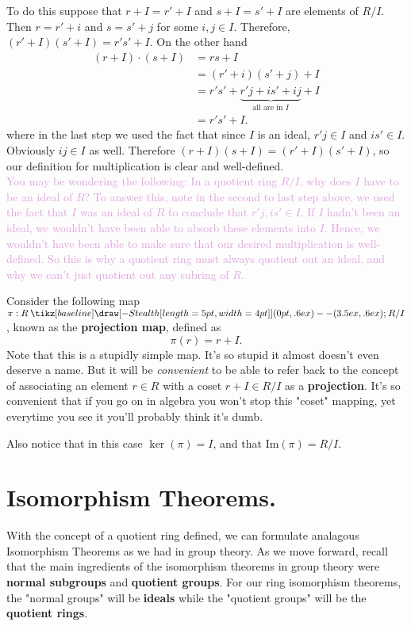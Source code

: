 \documentclass[12pt,letterpaper]{algebra_book}
\renewcommand{\to}{\mathbin{\tikz[baseline] \draw[-{Stealth[length=5pt,width=4pt]}] (0pt,.6ex) -- (3.5ex,.6ex);}}
\newcommand{\im}{\mbox{Im}}
\theoremstyle{definition}
\begin{document}
    To do this suppose that $r + I = r' + I$ and $s + I = s' + I$
    are elements of $R/I$. Then $r = r' + i$ and $s = s' + j$ for
    some $i, j \in I$. 
    Therefore, $(r' + I)(s' + I) = r's' + I$. On the other hand
    \begin{align*}
        (r + I)\cdot(s + I) &= rs + I\\
        &= (r' + i)(s' + j) + I\\
        &= r's' + \underbrace{r'j + is' + ij}_{\text{all are in } I} + I\\
        &= r's' + I.
    \end{align*}
    where in the last step we used the fact that since $I$ is an
    ideal, $r'j \in I$ and $is' \in
    I.$ Obviously $ij \in I$ as well. Therefore $(r + I)(s + I) =
    (r' + I)(s' + I)$, so our definition for
    multiplication is clear and well-defined.             
    \\
    
    \textcolor{Plum}{
    You may be wondering the following: In a quotient ring $R/I$,
    why does $I$ have to be an ideal of $R$? To answer this,     
    note in the second to last step above, we
    used the fact that $I$ was 
    an ideal of $R$ to conclude that $r'j, is' \in I$. If $I$
    hadn't been an ideal, we wouldn't have been able to absorb
    these elements into $I$. Hence, we wouldn't have been able to
    make sure that our desired multiplication is well-defined.
    So this is why a quotient ring
    must always quotient out an ideal, and why we can't just
    quotient out any subring of $R$. }
    \begin{definition}
        Consider the following map $\pi: R \to R/I$, known as the
        \textbf{projection map}, defined as 
        \[
            \pi(r) = r + I.
        \]
        Note that this is a stupidly simple map. It's so stupid it
        almost doesn't even deserve a name. But it will be
        \textit{convenient} to be able to refer back to the
        concept of associating an element $r \in R$ with a coset
        $r + I \in R/I$ as a \textbf{projection}. It's so
        convenient that if you go on in algebra you won't stop
        this "coset" mapping, yet everytime you see it you'll
        probably think it's dumb.

        Also notice that in this case $\ker(\pi) = I$, and that
        $\im(\pi) = R/I$.
    \end{definition}        

    \newpage
    \section{Isomorphism Theorems.}
    With the concept of a quotient ring defined, we can formulate
    analagous Isomorphism Theorems as we had in group theory. As
    we move forward, recall that the main ingredients of the
    isomorphism theorems in group theory were \textbf{normal
    subgroups} and \textbf{quotient groups}. For our ring
    isomorphism theorems, the "normal groups" will be
    \textbf{ideals} while the "quotient groups" will be the
    \textbf{quotient rings}. 
\end{document}
